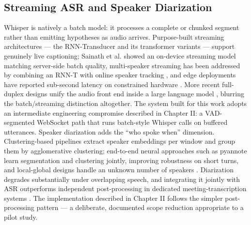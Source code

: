 \documentclass[12pt]{report}
\begin{document}
\subsection{Streaming ASR and Speaker Diarization}
Whisper is natively a batch model: it processes a complete or chunked segment rather than emitting hypotheses as audio arrives. Purpose-built streaming architectures --- the RNN-Transducer and its transformer variants \cite{moritz2020streaming,tsunoo2021streaming,chen2021developing} --- support genuinely live captioning; Sainath et al. \cite{sainath2020streaming} showed an on-device streaming model matching server-side batch quality, multi-speaker streaming has been addressed by combining an RNN-T with online speaker tracking \cite{sklyar2021streaming}, and edge deployments have reported sub-second latency on constrained hardware \cite{dileo2025realtime}. More recent full-duplex designs unify the audio front end inside a large language model \cite{li2026uaf}, blurring the batch/streaming distinction altogether. The system built for this work adopts an intermediate engineering compromise described in Chapter II: a VAD-segmented WebSocket path that runs batch-style Whisper calls on buffered utterances.
Speaker diarization adds the \enquote{who spoke when} dimension. Clustering-based pipelines extract speaker embeddings per window and group them by agglomerative clustering; end-to-end neural approaches such as pyannote \cite{bredin2020pyannote} learn segmentation and clustering jointly, improving robustness on short turns, and local-global designs handle an unknown number of speakers \cite{maiti2021endtoend}. Diarization degrades substantially under overlapping speech, and integrating it jointly with ASR outperforms independent post-processing in dedicated meeting-transcription systems \cite{raj2021integration,yoshioka2019advances,wang2021exploring}. The implementation described in Chapter II follows the simpler post-processing pattern --- a deliberate, documented scope reduction appropriate to a pilot study.
\end{document}
